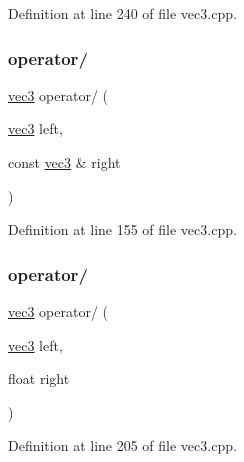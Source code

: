 Definition at line 240 of file vec3.\+cpp.

\mbox{\label{structspork_1_1maths_1_1vec3_af38169a8a95a92def18943d0c4836f16}} 
\subsubsection{\texorpdfstring{operator/}{operator/}\hspace{0.1cm}{\footnotesize\ttfamily [1/2]}}
{\footnotesize\ttfamily \hyperlink{structspork_1_1maths_1_1vec3}{vec3} operator/ (\begin{DoxyParamCaption}\item[{\hyperlink{structspork_1_1maths_1_1vec3}{vec3}}]{left,  }\item[{const \hyperlink{structspork_1_1maths_1_1vec3}{vec3} \&}]{right }\end{DoxyParamCaption})\hspace{0.3cm}{\ttfamily [friend]}}



Definition at line 155 of file vec3.\+cpp.

\mbox{\label{structspork_1_1maths_1_1vec3_a20e5a67b725a828200ca2ea765ce8ac1}} 
\subsubsection{\texorpdfstring{operator/}{operator/}\hspace{0.1cm}{\footnotesize\ttfamily [2/2]}}
{\footnotesize\ttfamily \hyperlink{structspork_1_1maths_1_1vec3}{vec3} operator/ (\begin{DoxyParamCaption}\item[{\hyperlink{structspork_1_1maths_1_1vec3}{vec3}}]{left,  }\item[{float}]{right }\end{DoxyParamCaption})\hspace{0.3cm}{\ttfamily [friend]}}



Definition at line 205 of file vec3.\+cpp.

\mbox{\label{structspork_1_1maths_1_1vec3_aadd73ce1bc8619c0a69cf9f9c0810819}} 
